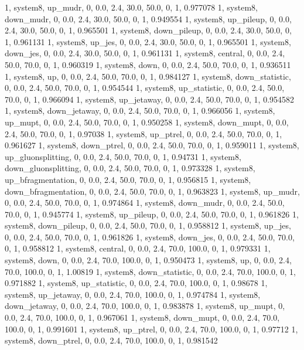 1, system8, up_mudr,         0, 0.0, 2.4, 30.0, 50.0, 0, 1, 0.977078
1, system8, down_mudr,       0, 0.0, 2.4, 30.0, 50.0, 0, 1, 0.949554
1, system8, up_pileup,       0, 0.0, 2.4, 30.0, 50.0, 0, 1, 0.965501
1, system8, down_pileup,     0, 0.0, 2.4, 30.0, 50.0, 0, 1, 0.961131
1, system8, up_jes,          0, 0.0, 2.4, 30.0, 50.0, 0, 1, 0.965501
1, system8, down_jes,        0, 0.0, 2.4, 30.0, 50.0, 0, 1, 0.961131
1, system8, central,    0, 0.0, 2.4, 50.0, 70.0, 0, 1, 0.960319
1, system8, down,       0, 0.0, 2.4, 50.0, 70.0, 0, 1, 0.936511
1, system8, up,         0, 0.0, 2.4, 50.0, 70.0, 0, 1, 0.984127
1, system8, down_statistic,       0, 0.0, 2.4, 50.0, 70.0, 0, 1, 0.954544
1, system8, up_statistic,         0, 0.0, 2.4, 50.0, 70.0, 0, 1, 0.966094
1, system8, up_jetaway,      0, 0.0, 2.4, 50.0, 70.0, 0, 1, 0.954582
1, system8, down_jetaway,    0, 0.0, 2.4, 50.0, 70.0, 0, 1, 0.966056
1, system8, up_mupt,         0, 0.0, 2.4, 50.0, 70.0, 0, 1, 0.950258
1, system8, down_mupt,       0, 0.0, 2.4, 50.0, 70.0, 0, 1, 0.97038
1, system8, up_ptrel,        0, 0.0, 2.4, 50.0, 70.0, 0, 1, 0.961627
1, system8, down_ptrel,      0, 0.0, 2.4, 50.0, 70.0, 0, 1, 0.959011
1, system8, up_gluonsplitting, 0, 0.0, 2.4, 50.0, 70.0, 0, 1, 0.94731
1, system8, down_gluonsplitting, 0, 0.0, 2.4, 50.0, 70.0, 0, 1, 0.973328
1, system8, up_bfragmentation, 0, 0.0, 2.4, 50.0, 70.0, 0, 1, 0.956815
1, system8, down_bfragmentation, 0, 0.0, 2.4, 50.0, 70.0, 0, 1, 0.963823
1, system8, up_mudr,         0, 0.0, 2.4, 50.0, 70.0, 0, 1, 0.974864
1, system8, down_mudr,       0, 0.0, 2.4, 50.0, 70.0, 0, 1, 0.945774
1, system8, up_pileup,       0, 0.0, 2.4, 50.0, 70.0, 0, 1, 0.961826
1, system8, down_pileup,     0, 0.0, 2.4, 50.0, 70.0, 0, 1, 0.958812
1, system8, up_jes,          0, 0.0, 2.4, 50.0, 70.0, 0, 1, 0.961826
1, system8, down_jes,        0, 0.0, 2.4, 50.0, 70.0, 0, 1, 0.958812
1, system8, central,    0, 0.0, 2.4, 70.0, 100.0, 0, 1, 0.979331
1, system8, down,       0, 0.0, 2.4, 70.0, 100.0, 0, 1, 0.950473
1, system8, up,         0, 0.0, 2.4, 70.0, 100.0, 0, 1, 1.00819
1, system8, down_statistic,       0, 0.0, 2.4, 70.0, 100.0, 0, 1, 0.971882
1, system8, up_statistic,         0, 0.0, 2.4, 70.0, 100.0, 0, 1, 0.98678
1, system8, up_jetaway,      0, 0.0, 2.4, 70.0, 100.0, 0, 1, 0.974784
1, system8, down_jetaway,    0, 0.0, 2.4, 70.0, 100.0, 0, 1, 0.983878
1, system8, up_mupt,         0, 0.0, 2.4, 70.0, 100.0, 0, 1, 0.967061
1, system8, down_mupt,       0, 0.0, 2.4, 70.0, 100.0, 0, 1, 0.991601
1, system8, up_ptrel,        0, 0.0, 2.4, 70.0, 100.0, 0, 1, 0.97712
1, system8, down_ptrel,      0, 0.0, 2.4, 70.0, 100.0, 0, 1, 0.981542
